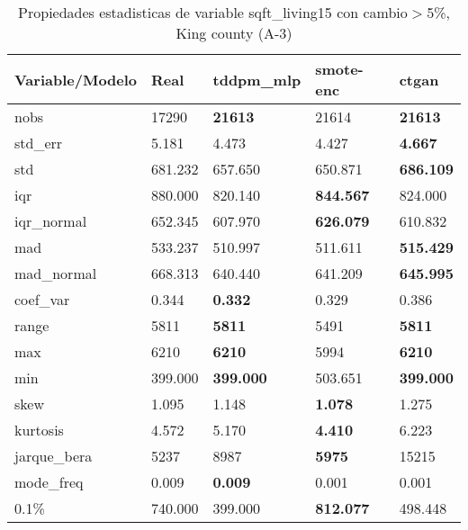 \begin{table}[H]
\centering
\fontsize{8}{14}\selectfont
\caption{Propiedades estadisticas de variable sqft\_living15 con cambio\ensuremath{>}5\%, King county (A-3)}
\label{table-stats-king county-a-3-sqft_living15-short}
\begin{tabular}{|l|m{10em}|m{10em}|m{10em}|m{10em}|}
\hline
 \rowcolor[gray]{0.8}
Variable/Modelo & Real & tddpm\_mlp & smote-enc & ctgan \\
\hline nobs & 17290 & \bfseries 21613 & \cellcolor[rgb]{0.9, 0.54, 0.52} 21614 & \bfseries 21613 \\
\hline std\_err & 5.181 & 4.473 & \cellcolor[rgb]{0.9, 0.54, 0.52} 4.427 & \bfseries 4.667 \\
\hline std & 681.232 & 657.650 & \cellcolor[rgb]{0.9, 0.54, 0.52} 650.871 & \bfseries 686.109 \\
\hline iqr & 880.000 & \cellcolor[rgb]{0.9, 0.54, 0.52} 820.140 & \bfseries 844.567 & 824.000 \\
\hline iqr\_normal & 652.345 & \cellcolor[rgb]{0.9, 0.54, 0.52} 607.970 & \bfseries 626.079 & 610.832 \\
\hline mad & 533.237 & \cellcolor[rgb]{0.9, 0.54, 0.52} 510.997 & 511.611 & \bfseries 515.429 \\
\hline mad\_normal & 668.313 & \cellcolor[rgb]{0.9, 0.54, 0.52} 640.440 & 641.209 & \bfseries 645.995 \\
\hline coef\_var & 0.344 & \bfseries 0.332 & 0.329 & \cellcolor[rgb]{0.9, 0.54, 0.52} 0.386 \\
\hline range & 5811 & \bfseries 5811 & \cellcolor[rgb]{0.9, 0.54, 0.52} 5491 & \bfseries 5811 \\
\hline max & 6210 & \bfseries 6210 & \cellcolor[rgb]{0.9, 0.54, 0.52} 5994 & \bfseries 6210 \\
\hline min & 399.000 & \bfseries 399.000 & \cellcolor[rgb]{0.9, 0.54, 0.52} 503.651 & \bfseries 399.000 \\
\hline skew & 1.095 & 1.148 & \bfseries 1.078 & \cellcolor[rgb]{0.9, 0.54, 0.52} 1.275 \\
\hline kurtosis & 4.572 & 5.170 & \bfseries 4.410 & \cellcolor[rgb]{0.9, 0.54, 0.52} 6.223 \\
\hline jarque\_bera & 5237 & 8987 & \bfseries 5975 & \cellcolor[rgb]{0.9, 0.54, 0.52} 15215 \\
\hline mode\_freq & 0.009 & \bfseries 0.009 & \cellcolor[rgb]{0.9, 0.54, 0.52} 0.001 & 0.001 \\
\hline 0.1\% & 740.000 & \cellcolor[rgb]{0.9, 0.54, 0.52} 399.000 & \bfseries 812.077 & 498.448 \\

\end{tabular}
\end{table}

